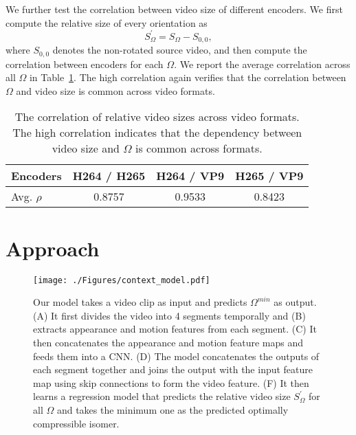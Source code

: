 \documentclass[journal,transmag]{IEEEtran}
\begin{document}
We further test the correlation between video size of different encoders.
We first compute the relative size of every orientation as
\begin{equation}
    S^{\prime}_{\Omega} = S_{\Omega} - S_{0,0},
    \label{eq:relative_size}
\end{equation}
where $S_{0,0}$ denotes the non-rotated source video, and then compute the correlation between encoders for each $\Omega$.
We report the average correlation across all $\Omega$ in Table~\ref{tab:correlations}.
The high correlation again verifies that the correlation between $\Omega$ and video size is common across video formats.

\begin{table}[t]
    \small
    \center
    \begin{tabular}{lccc}
    \toprule
    Encoders & H264 / H265 & H264 / VP9 & H265 / VP9\\
    \midrule
        Avg. $\rho$ & 0.8757  & 0.9533 & 0.8423 \\
    \bottomrule
    \end{tabular}
    \caption{
        The correlation of relative video sizes across video formats.
        The high correlation indicates that the dependency between video size and $\Omega$ is common across formats.
    }
    \label{tab:correlations}
\end{table}

\section{Approach}
\label{sec:approach}

\begin{figure*}[t]
    \center
    \texttt{[image: ./Figures/context\_model.pdf]}
    \caption{
        Our model takes a video clip as input and predicts $\Omega^{min}$ as output.
        (A) It first divides the video into 4 segments temporally and (B) extracts appearance and motion features from each segment.
        (C) It then concatenates the appearance and motion feature maps and feeds them into a CNN.
        (D) The model concatenates the outputs of each segment together and joins the output with the input feature map using skip connections to form the video feature.
        (F) It then learns a regression model that predicts the relative video size $S^{\prime}_{\Omega}$ for all $\Omega$ and takes the minimum one as the predicted optimally compressible isomer.
    }
    \label{fig:model}
\end{figure*}
\end{document}
